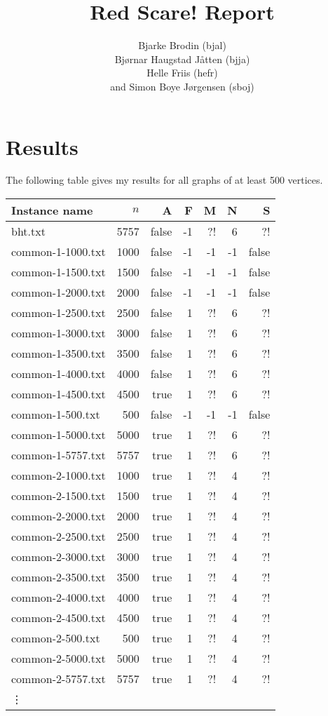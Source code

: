 \documentclass{tufte-handout}
\title{Red Scare! Report}
\author{
  Bjarke Brodin (bjal)\\
  Bjørnar Haugstad Jåtten (bjja)\\
  Helle Friis (hefr)\\
  and Simon Boye Jørgensen (sboj)
}
\begin{document}
\maketitle

\section{Results}

The following table gives my results for all graphs of at least 500 vertices.

\medskip
\begin{tabular}{lrrrrrr}
  \toprule
  Instance name & $n$ & A & F & M & N & S \\
  \midrule
  bht.txt&	5757 &	false &	-1 &	?! &	6 &	?! &	\\
  common-1-1000.txt&	1000 &	false &	-1 &	-1 &	-1 &	false &	\\
  common-1-1500.txt&	1500 &	false &	-1 &	-1 &	-1 &	false &	\\
  common-1-2000.txt&	2000 &	false &	-1 &	-1 &	-1 &	false &	\\
  common-1-2500.txt&	2500 &	false &	1 &	?! &	6 &	?! &	\\
  common-1-3000.txt&	3000 &	false &	1 &	?! &	6 &	?! &	\\
  common-1-3500.txt&	3500 &	false &	1 &	?! &	6 &	?! &	\\
  common-1-4000.txt&	4000 &	false &	1 &	?! &	6 &	?! &	\\
  common-1-4500.txt&	4500 &	true &	1 &	?! &	6 &	?! &	\\
  common-1-500.txt&	500 &	false &	-1 &	-1 &	-1 &	false &	\\
  common-1-5000.txt&	5000 &	true &	1 &	?! &	6 &	?! &	\\
  common-1-5757.txt&	5757 &	true &	1 &	?! &	6 &	?! &	\\
  common-2-1000.txt&	1000 &	true &	1 &	?! &	4 &	?! &	\\
  common-2-1500.txt&	1500 &	true &	1 &	?! &	4 &	?! &	\\
  common-2-2000.txt&	2000 &	true &	1 &	?! &	4 &	?! &	\\
  common-2-2500.txt&	2500 &	true &	1 &	?! &	4 &	?! &	\\
  common-2-3000.txt&	3000 &	true &	1 &	?! &	4 &	?! &	\\
  common-2-3500.txt&	3500 &	true &	1 &	?! &	4 &	?! &	\\
  common-2-4000.txt&	4000 &	true &	1 &	?! &	4 &	?! &	\\
  common-2-4500.txt&	4500 &	true &	1 &	?! &	4 &	?! &	\\
  common-2-500.txt&	500 &	true &	1 &	?! &	4 &	?! &	\\
  common-2-5000.txt&	5000 &	true &	1 &	?! &	4 &	?! &	\\
  common-2-5757.txt&	5757 &	true &	1 &	?! &	4 &	?! &	\\
    \vdots
  \bottomrule
\end{tabular}
\end{document}
